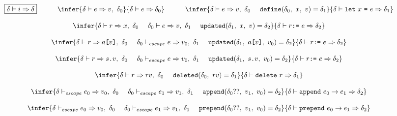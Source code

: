 \documentclass[11pt]{article}
\newcommand{\Term}[1]{\texttt{#1}}
\newcommand{\cs}[0]{\quad}
\newcommand{\symstate}[0]{\delta}
\newcommand{\evalinst}[3]{#1 \vdash #2 \Rightarrow #3}
\newcommand{\evalexpr}[4]{#1 \vdash #2 \Rightarrow #3,\ #4}
\newcommand{\evalescexpr}[4]{#1 \vdash_{escape} #2 \Rightarrow #3,\ #4}
\newcommand{\evalref}[4]{#1 \vdash #2 \Rightarrow #3,\ #4}
\begin{document}
\[
\begin{array}{c}
\multicolumn{1}{c}{\begin{array}{ccccc}
\fbox{$\evalinst{\symstate}{i}{\symstate}$}
&
\cs
&
\infer
{ \evalexpr{\symstate}{e}{v}{\symstate_0} }
{ \evalinst{\symstate}{e}{\symstate_0} }
&
\cs
&
\infer
{ \evalexpr{\symstate}{e}{v}{\symstate_0}\ \ \ \
\Term{define}( \symstate_0,\ x,\ v ) = \symstate_1}
{ \evalinst{\symstate}{\Term{let}\ x\ \Term{=}\ e}{\symstate_1} }
\end{array}}
\\ \\
\infer
{ \evalref{\symstate}{r}{x}{\symstate_0}\ \ \ \
\evalexpr{\symstate_0}{e}{v}{\symstate_1}\ \ \ \
\Term{updated}(\symstate_1,\ x,\ v ) = \symstate_2}
{ \evalinst{\symstate}{r \Term{:=}\ e}{\symstate_2} }
\\ \\
\infer
{ \evalref{\symstate}{r}{a\Term{[} v \Term{]}}{\symstate_0}\ \ \ \
\evalescexpr{\symstate_0}{e}{v_0}{\symstate_1}\ \ \ \
\Term{updated}(\symstate_1,\ a\Term{[} v \Term{]},\ v_0 ) = \symstate_2 }
{ \evalinst{\symstate}{r \Term{:=}\ e}{\symstate_2} }
\\ \\
\infer
{ \evalref{\symstate}{r}{s\Term{.}v}{\symstate_0}\ \ \ \
\evalescexpr{\symstate_0}{e}{v_0}{\symstate_1}\ \ \ \
\Term{updated}(\symstate_1,\ s\Term{.}v,\ v_0 ) = \symstate_2}
{ \evalinst{\symstate}{r \Term{:=}\ e}{\symstate_2} }
\\ \\
\infer
{ \evalref{\symstate}{r}{rv}{\symstate_0}\ \ \ \
\Term{deleted}(\symstate_0,\ rv) = \symstate_1}
{ \evalinst{\symstate}{\Term{delete}\ r}{\symstate_1} }
\\ \\
\infer
{ \evalescexpr{\symstate}{e_0}{v_0}{\symstate_0}\ \ \ \
\evalescexpr{\symstate_0}{e_1}{v_1}{\symstate_1}\ \ \ \
\Term{append}(\symstate_0 ??,\ v_1,\ v_0) = \symstate_2}
{ \evalinst{\symstate}{\Term{append}\ e_0 \to e_1}{\symstate_2} }
\\ \\
\infer
{ \evalescexpr{\symstate}{e_0}{v_0}{\symstate_0}\ \ \ \
\evalescexpr{\symstate_0}{e_1}{v_1}{\symstate_1}\ \ \ \
\Term{prepend}(\symstate_0 ??,\ v_1,\ v_0) = \symstate_2}
{ \evalinst{\symstate}{\Term{prepend}\ e_0 \to e_1}{\symstate_2} }
\\ \\

\end{array}\]
\end{document}
